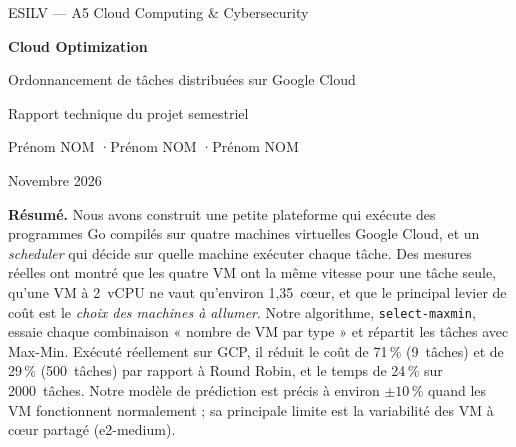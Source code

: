 \documentclass[11pt,a4paper]{article}
\newcommand{\sel}{\texttt{select-maxmin}}
\begin{document}
\begin{titlepage}
  \centering
  \vspace*{2cm}
  {\large ESILV — A5 Cloud Computing \& Cybersecurity\par}
  \vspace{1.5cm}
  {\LARGE\bfseries Cloud Optimization\par}
  \vspace{0.4cm}
  {\Large Ordonnancement de tâches distribuées sur Google Cloud\par}
  \vspace{0.3cm}
  {\large Rapport technique du projet semestriel\par}
  \vspace{2cm}
  {\large Prénom NOM \quad·\quad Prénom NOM \quad·\quad Prénom NOM\par}
  \vspace{1cm}
  {\large Novembre 2026\par}
  \vfill
  \begin{minipage}{0.85\textwidth}
    \small
    \textbf{Résumé.} Nous avons construit une petite plateforme qui exécute des
    programmes Go compilés sur quatre machines virtuelles Google Cloud, et un
    \emph{scheduler} qui décide sur quelle machine exécuter chaque tâche. Des
    mesures réelles ont montré que les quatre VM ont la même vitesse pour une
    tâche seule, qu'une VM à 2~vCPU ne vaut qu'environ 1,35~cœur, et que le
    principal levier de coût est le \emph{choix des machines à allumer}. Notre
    algorithme, \sel{}, essaie chaque combinaison « nombre de VM par type » et
    répartit les tâches avec Max-Min. Exécuté réellement sur GCP, il réduit le
    coût de 71\,\% (9~tâches) et de 29\,\% (500~tâches) par rapport à Round
    Robin, et le temps de 24\,\% sur 2000~tâches. Notre modèle de prédiction est
    précis à environ $\pm 10\,\%$ quand les VM fonctionnent normalement ; sa
    principale limite est la variabilité des VM à cœur partagé (e2-medium).
  \end{minipage}
  \vspace{1cm}
\end{titlepage}

\tableofcontents
\newpage












\appendix

\end{document}
